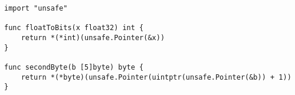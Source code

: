 \begin{lstlisting}[language=Golang, label=lst:unsafe-examples, caption=Usage examples of the Go \textit{unsafe} API]
import "unsafe"

func floatToBits(x float32) int {
    return *(*int)(unsafe.Pointer(&x))
}

func secondByte(b [5]byte) byte {
    return *(*byte)(unsafe.Pointer(uintptr(unsafe.Pointer(&b)) + 1))
}
\end{lstlisting}